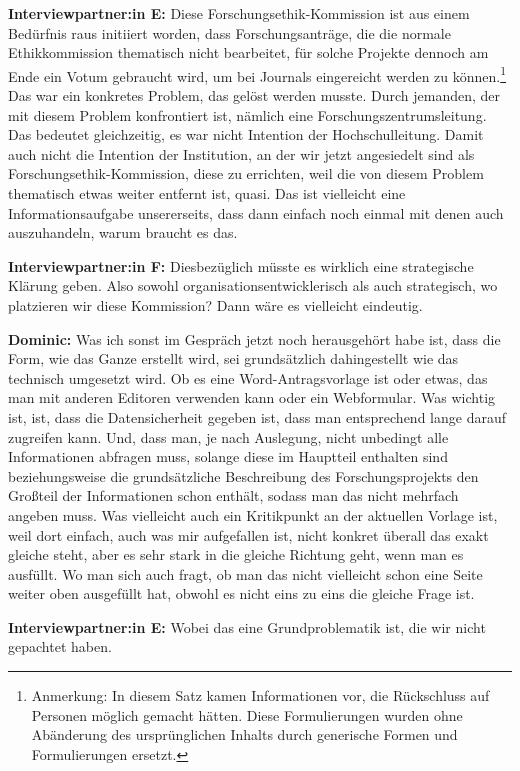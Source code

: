 \documentclass[a4paper,12pt,twoside,numbers=noendperiod]{scrreprt}
\begin{document}
\textbf{Interviewpartner:in E:} Diese Forschungsethik-Kommission ist aus einem Bedürfnis raus initiiert worden, dass Forschungsanträge, die die normale Ethikkommission thematisch nicht bearbeitet, für solche Projekte dennoch am Ende ein Votum gebraucht wird, um bei Journals eingereicht werden zu können.\footnote{Anmerkung: In diesem Satz kamen Informationen vor, die Rückschluss auf Personen möglich gemacht hätten. Diese Formulierungen wurden ohne Abänderung des ursprünglichen Inhalts durch generische Formen und Formulierungen ersetzt.} Das war ein konkretes Problem, das gelöst werden musste. Durch jemanden, der mit diesem Problem konfrontiert ist, nämlich eine Forschungszentrumsleitung. Das bedeutet gleichzeitig, es war nicht Intention der Hochschulleitung. Damit auch nicht die Intention der Institution, an der wir jetzt angesiedelt sind als Forschungsethik-Kommission, diese zu errichten, weil die von diesem Problem thematisch etwas weiter entfernt ist, quasi. Das ist vielleicht eine Informationsaufgabe unsererseits, dass dann einfach noch einmal mit denen auch auszuhandeln, warum braucht es das.

\textbf{Interviewpartner:in F:} Diesbezüglich müsste es wirklich eine strategische Klärung geben. Also sowohl organisationsentwicklerisch als auch strategisch, wo platzieren wir diese Kommission? Dann wäre es vielleicht eindeutig.

\textbf{Dominic:} Was ich sonst im Gespräch jetzt noch herausgehört habe ist, dass die Form, wie das Ganze erstellt wird, sei grundsätzlich dahingestellt wie das technisch umgesetzt wird. Ob es eine Word-Antragsvorlage ist oder etwas, das man mit anderen Editoren verwenden kann oder ein Webformular. Was wichtig ist, ist, dass die Datensicherheit gegeben ist, dass man entsprechend lange darauf zugreifen kann. Und, dass man, je nach Auslegung, nicht unbedingt alle Informationen abfragen muss, solange diese im Hauptteil enthalten sind beziehungsweise die grundsätzliche Beschreibung des Forschungsprojekts den Großteil der Informationen schon enthält, sodass man das nicht mehrfach angeben muss. Was vielleicht auch ein Kritikpunkt an der aktuellen Vorlage ist, weil dort einfach, auch was mir aufgefallen ist, nicht konkret überall das exakt gleiche steht, aber es sehr stark in die gleiche Richtung geht, wenn man es ausfüllt. Wo man sich auch fragt, ob man das nicht vielleicht schon eine Seite weiter oben ausgefüllt hat, obwohl es nicht eins zu eins die gleiche Frage ist.

\textbf{Interviewpartner:in E:} Wobei das eine Grundproblematik ist, die wir nicht gepachtet haben.
\end{document}
